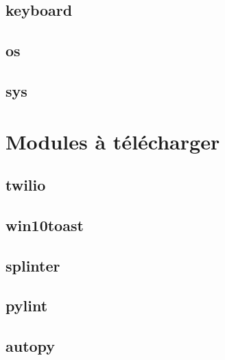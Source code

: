 \documentclass[a4paper, french, 10pt]{article}
\begin{document}
\subsection{keyboard}
\subsection{os}
\subsection{sys}


\section{Modules à télécharger}
\subsection{twilio}
\subsection{win10toast}
\subsection{splinter}
\subsection{pylint}

\subsection{autopy}


\printindex
\end{document}
